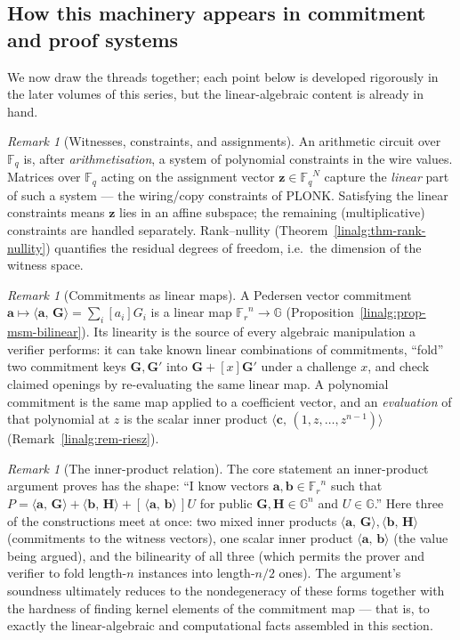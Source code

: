 \documentclass[11pt,a4paper]{article}
\theoremstyle{definition}
\theoremstyle{remark}
\newtheorem{remark}[theorem]{Remark}
\newcommand{\G}{\ensuremath{\mathbb{G}}}
\newcommand{\Fq}{\ensuremath{\mathbb{F}_{q}}}
\newcommand{\ip}[2]{\langle #1,\, #2 \rangle}
\newcommand{\Fr}{\ensuremath{\mathbb{F}_{r}}}
\begin{document}
\subsection{How this machinery appears in commitment and proof systems}\label{linalg:subsec-crypto}

We now draw the threads together; each point below is developed rigorously in the later volumes of this series, but the linear-algebraic content is already in hand.

\begin{remark}[Witnesses, constraints, and assignments]\label{linalg:rem-constraints}
An arithmetic circuit over \(\Fq\) is, after \emph{arithmetisation}, a system of polynomial constraints in the wire values. Matrices over \(\Fq\) acting on the assignment vector \(\mathbf z \in \Fq^N\) capture the \emph{linear} part of such a system — the wiring/copy constraints of PLONK. Satisfying the linear constraints means \(\mathbf z\) lies in an affine subspace; the remaining (multiplicative) constraints are handled separately. Rank--nullity (Theorem~\ref{linalg:thm-rank-nullity}) quantifies the residual degrees of freedom, i.e.\ the dimension of the witness space.
\end{remark}

\begin{remark}[Commitments as linear maps]\label{linalg:rem-commit-linear}
A Pedersen vector commitment \(\mathbf a \mapsto \ip{\mathbf a}{\mathbf G} = \sum_i [a_i]G_i\) is a linear map \(\Fr^n \to \G\) (Proposition~\ref{linalg:prop-msm-bilinear}). Its linearity is the source of every algebraic manipulation a verifier performs: it can take known linear combinations of commitments, ``fold'' two commitment keys \(\mathbf G, \mathbf G'\) into \(\mathbf G + [x]\mathbf G'\) under a challenge \(x\), and check claimed openings by re-evaluating the same linear map. A polynomial commitment is the same map applied to a coefficient vector, and an \emph{evaluation} of that polynomial at \(z\) is the scalar inner product \(\ip{\mathbf c}{(1,z,\dots,z^{n-1})}\) (Remark~\ref{linalg:rem-riesz}).
\end{remark}

\begin{remark}[The inner-product relation]\label{linalg:rem-ipa}
The core statement an inner-product argument proves has the shape: ``I know vectors \(\mathbf a, \mathbf b \in \Fr^n\) such that \(P = \ip{\mathbf a}{\mathbf G} + \ip{\mathbf b}{\mathbf H} + [\,\ip{\mathbf a}{\mathbf b}\,]U\) for public \(\mathbf G, \mathbf H \in \G^n\) and \(U \in \G\).'' Here three of the constructions meet at once: two mixed inner products \(\ip{\mathbf a}{\mathbf G}, \ip{\mathbf b}{\mathbf H}\) (commitments to the witness vectors), one scalar inner product \(\ip{\mathbf a}{\mathbf b}\) (the value being argued), and the bilinearity of all three (which permits the prover and verifier to fold length-\(n\) instances into length-\(n/2\) ones). The argument's soundness ultimately reduces to the nondegeneracy of these forms together with the hardness of finding kernel elements of the commitment map — that is, to exactly the linear-algebraic and computational facts assembled in this section.
\end{remark}
\end{document}
